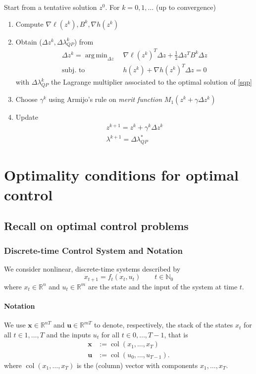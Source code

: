 \documentclass[openany]{book}
\DeclareMathOperator{\col}{col}            %
\DeclareMathOperator*{\argmin}{arg\,min}   %
\newcommand{\R}{\mathbb{R}}                %
\newcommand{\N}{\mathbb{N}}                %
\theoremstyle{definition}
\theoremstyle{remark}
\begin{document}
Start from a tentative solution $z^0$. For $k=0,1,\dots$ (up to convergence)
\begin{enumerate}
    \item Compute $\nabla\ell(z^k),B^k,\nabla h(z^k)$ 
    \item Obtain ($\Delta z^k, \Delta \lambda^k_{QP}$) from 
        \begin{align}\label{sqp}
                \Delta z^k = \argmin_{\Delta z}\  & \nabla \ell(z^k)^T\Delta z +\displaystyle\frac{1}{2}\Delta z^T B^k \Delta z \\
                \text{subj. to }\  & h(z^k) + \nabla h(z^k)^T \Delta z = 0
        \end{align}
        with $\Delta\lambda^k_{QP}$ the Lagrange multiplier associated to the optimal solution of \eqref{sqp}
    \item Choose $\gamma^k$ using Armijo's rule on \emph{merit function} $M_1(z^k+\gamma\Delta z^k)$
    \item Update 
        \begin{gather*}
            z^{k+1} = z^k+ \gamma^k\Delta z^k \\
            \lambda^{k+1} = \Delta \lambda^*_{QP}
        \end{gather*}
\end{enumerate}


\chapter{Optimality conditions for optimal control}
\section{Recall on optimal control problems}
\subsection{Discrete-time Control System and Notation}

We consider nonlinear, discrete-time systems described by
\begin{equation}
    x_{t+1} = f_t(x_t, u_t) \qquad t \in \N_0
\end{equation}
where $x_t \in \R^n$ and $u_t \in \R^m$ are the state and the input of the system at time $t$.

\subsubsection*{Notation}
We use $\mathbf{x} \in \R^{nT}$ and $\mathbf{u} \in \R^{mT}$ to denote, respectively, the stack of the states $x_t$ for all $t \in 1,\ldots,T$ and the inputs $u_t$ for all $t \in 0,\ldots,T-1$, that is
\begin{align*}
    \mathbf{x} &:= \col(x_1,\ldots,x_T) \\
    \mathbf{u} &:= \col(u_0,\ldots,u_{T-1}).
\end{align*}
where $\col(x_1,\ldots,x_T)$ is the (column) vector with components $x_1,\ldots,x_T$.
\end{document}
